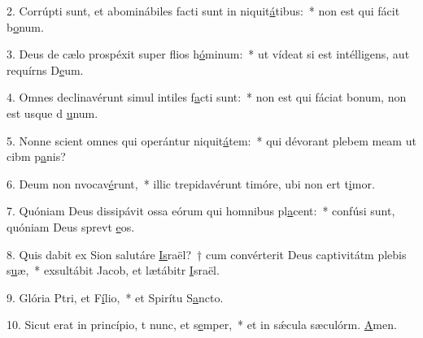 2. Corrúpti sunt, et abominábiles facti sunt in niquit\uline{á}tibus:~* non est qui fácit b\uline{o}num.\par 
3. Deus de cælo prospéxit super flios h\uline{ó}minum:~* ut vídeat si est intélligens, aut requírns D\uline{e}um.\par 
4. Omnes declinavérunt simul intiles f\uline{a}cti sunt:~* non est qui fáciat bonum, non est usque d \uline{u}num.\par 
5. Nonne scient omnes qui operántur niquit\uline{á}tem:~* qui dévorant plebem meam ut cibm p\uline{a}nis?\par 
6. Deum non nvocav\uline{é}runt,~* illic trepidavérunt timóre, ubi non ert t\uline{i}mor.\par 
7. Quóniam Deus dissipávit ossa eórum qui homnibus pl\uline{a}cent:~* confúsi sunt, quóniam Deus sprevt \uline{e}os.\par 
8. Quis dabit ex Sion salutáre \uline{Is}raël?~† cum convérterit Deus captivitátm plebis s\uline{u}æ,~* exsultábit Jacob, et lætábitr \uline{I}sraël.\par 
9. Glória Ptri, et F\uline{í}lio,~* et Spirítu S\uline{a}ncto.\par 
10. Sicut erat in princípio, t nunc, et s\uline{e}mper,~* et in sǽcula sæculórm. \uline{A}men.\par 
